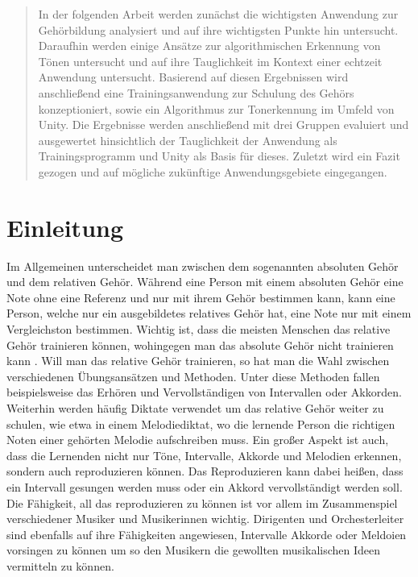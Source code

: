 \begin{abstract}
    In der folgenden Arbeit werden zunächst die wichtigsten Anwendung zur Gehörbildung analysiert und auf ihre wichtigsten Punkte hin untersucht. Daraufhin werden einige Ansätze zur algorithmischen Erkennung von Tönen untersucht und auf ihre Tauglichkeit im Kontext einer echtzeit Anwendung untersucht. Basierend auf diesen Ergebnissen wird anschließend eine Trainingsanwendung zur Schulung des Gehörs konzeptioniert, sowie ein Algorithmus zur Tonerkennung im Umfeld von Unity. Die Ergebnisse werden anschließend mit drei Gruppen evaluiert und ausgewertet hinsichtlich der Tauglichkeit der Anwendung als Trainingsprogramm und Unity als Basis für dieses. Zuletzt wird ein Fazit gezogen und auf mögliche zukünftige Anwendungsgebiete eingegangen.
\end{abstract}



\chapter{Einleitung}
Im Allgemeinen unterscheidet man zwischen dem sogenannten absoluten Gehör und dem relativen Gehör. Während eine Person mit einem absoluten Gehör eine Note ohne eine Referenz und nur mit ihrem Gehör bestimmen kann, kann eine Person, welche nur ein ausgebildetes relatives Gehör hat, eine Note nur mit einem Vergleichston bestimmen. Wichtig ist, dass die meisten Menschen das relative Gehör trainieren können, wohingegen man das absolute Gehör nicht trainieren kann \cite{gussmack2006latentes}. Will man das relative Gehör trainieren, so hat man die Wahl zwischen verschiedenen Übungsansätzen und Methoden. Unter diese Methoden fallen beispielsweise das Erhören und Vervollständigen von Intervallen oder Akkorden. Weiterhin werden häufig Diktate verwendet um das relative Gehör weiter zu schulen, wie etwa in einem Melodiediktat, wo die lernende Person die richtigen Noten einer gehörten Melodie aufschreiben muss. Ein großer Aspekt ist auch, dass die Lernenden nicht nur Töne, Intervalle, Akkorde und Melodien erkennen, sondern auch reproduzieren können. Das Reproduzieren kann dabei heißen, dass ein Intervall gesungen werden muss oder ein Akkord vervollständigt werden soll. Die Fähigkeit, all das reproduzieren zu können ist vor allem im Zusammenspiel verschiedener Musiker und Musikerinnen wichtig. Dirigenten und Orchesterleiter sind ebenfalls auf ihre Fähigkeiten angewiesen, Intervalle Akkorde oder Meldoien vorsingen zu können um so den Musikern die gewollten musikalischen Ideen vermitteln zu können. 

